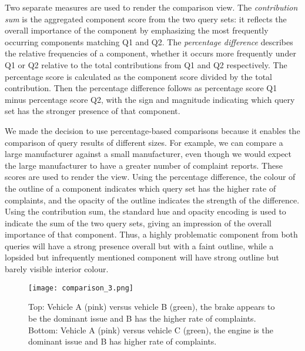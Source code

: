 Two separate measures are used to render the comparison view.
The \emph{contribution sum} is the aggregated component score from the two
query sets: it reflects the overall importance of the component by emphasizing
the most frequently occurring components matching Q1 and
Q2. The \emph{percentage difference} describes the relative frequencies of a
component, whether it occurs more frequently under Q1 or Q2 relative
to the total contributions from Q1 and Q2 respectively. The percentage
score is calculated as the component score divided by the total
contribution. Then the percentage difference follows as percentage
score Q1 minus percentage score Q2, with the sign and magnitude indicating
which query set has the stronger presence of that component.

We made the decision to use percentage-based comparisons because it
enables the comparison of query results of different sizes. For example, we can compare
a large manufacturer against a small manufacturer, even though we would expect the large 
manufacturer to have a greater number of complaint reports.
These scores are used to render the \threed view. Using the percentage
difference, the colour of the outline of a component indicates which
query set has the higher rate of complaints, and the opacity of the outline
indicates the strength of the difference. Using the contribution
sum, the standard hue and opacity encoding is used to indicate the
sum of the two query sets, giving an impression of the overall importance
of that component. Thus, a highly problematic component from
both queries will have a strong presence overall but with a faint outline,
while a lopsided but infrequently mentioned component will have
strong outline but barely visible interior colour.


	\begin{figure}
	 \centering  
	 \texttt{[image: comparison\_3.png]}
	 \caption[Comparison View]{Top: Vehicle A (pink) versus vehicle B (green), the
	 brake appears to be the dominant issue and B has the higher rate of complaints. Bottom:
	 Vehicle A (pink) versus vehicle C (green), the engine is the dominant issue
	 and B has higher rate of complaints.}
	 \label{figure:comparison}
	\end{figure}
 

